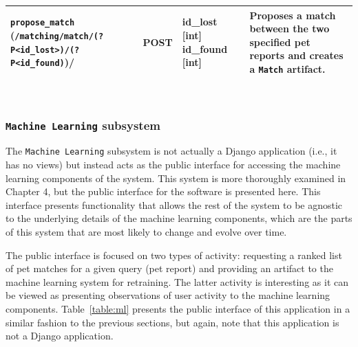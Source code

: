 \begin{table}[htb]
\begin{center}
\begin{tabularx}{ \textwidth}{| p{5cm} | l | p{2.5cm} | X | }
	{\tt propose_match} \newline ({\tt /matching/match/\newline(?P<id_lost>)/\newline(?P<id_found)})/ & POST & id_lost [int] \newline id_found [int] & Proposes a match between the two specified pet reports and creates a {\tt Match} artifact.\\ \hline	
		\end{tabularx}
   \\ \rule{0mm}{5mm}
	\end{center}
	 \label{table:matching}
\end{table}

\subsubsection {{\tt Machine Learning} subsystem}

The {\tt Machine Learning} subsystem is not actually a Django application (i.e., it has no views) but instead acts as the public interface for accessing the machine learning components of the system.  This system is more thoroughly examined in Chapter 4, but the public interface for the software is presented here.  This interface presents functionality that allows the rest of the system to be agnostic to the underlying details of the machine learning components, which are the parts of this system that are most likely to change and evolve over time.

The public interface is focused on two types of activity: requesting a ranked list of pet matches for a given query (pet report) and providing an artifact to the machine learning system for retraining.  The latter activity is interesting as it can be viewed as presenting observations of user activity to the machine learning components.  Table~\ref{table:ml} presents the public interface of this application in a similar fashion to the previous sections, but again, note that this application is not a Django application.


